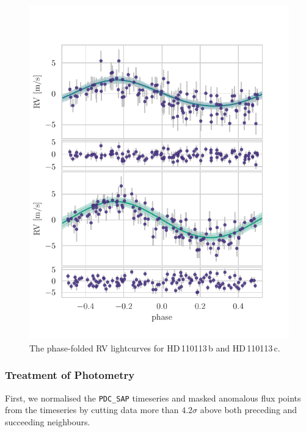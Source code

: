 \documentclass[fleqn,usenatbib]{mnras}
\newcommand{\Tplanet}{HD\,110113\,b}
\newcommand{\Tplanetc}{HD\,110113\,c}
\begin{document}
\begin{figure}
	\includegraphics[width=\columnwidth]{Phase_folded_RV_plots_3_GPs}
    \caption{The phase-folded RV lightcurves for \Tplanet{} and \Tplanetc{}.}
    \label{fig:phase_fold_rvs}
\end{figure}

\subsubsection{Treatment of Photometry}
First, we normalised the \texttt{PDC\_SAP} timeseries and masked anomalous flux points from the timeseries by cutting data more than $4.2\sigma$ above both preceding and succeeding neighbours.
\end{document}
